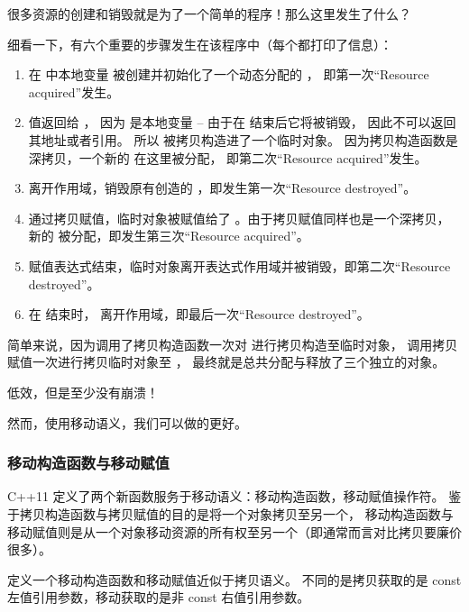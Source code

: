\documentclass[../../LearnCpp.tex]{subfiles}
\begin{document}
很多资源的创建和销毁就是为了一个简单的程序！那么这里发生了什么？

细看一下，有六个重要的步骤发生在该程序中（每个都打印了信息）：

\begin{enumerate}
  \item 在  中本地变量  被创建并初始化了一个动态分配的 ，
        即第一次“Resource acquired”发生。
  \item {} 值返回给 ，
        因为  是本地变量 -- 由于在  结束后它将被销毁，
        因此不可以返回其地址或者引用。
        所以  被拷贝构造进了一个临时对象。
        因为拷贝构造函数是深拷贝，一个新的  在这里被分配，
        即第二次“Resource acquired”发生。
  \item {} 离开作用域，销毁原有创造的 ，即发生第一次“Resource destroyed”。
  \item 通过拷贝赋值，临时对象被赋值给了 。由于拷贝赋值同样也是一个深拷贝，
        新的  被分配，即发生第三次“Resource acquired”。
  \item 赋值表达式结束，临时对象离开表达式作用域并被销毁，即第二次“Resource destroyed”。
  \item 在  结束时， 离开作用域，即最后一次“Resource destroyed”。
\end{enumerate}

简单来说，因为调用了拷贝构造函数一次对  进行拷贝构造至临时对象，
调用拷贝赋值一次进行拷贝临时对象至 ，
最终就是总共分配与释放了三个独立的对象。

低效，但是至少没有崩溃！

然而，使用移动语义，我们可以做的更好。

\subsubsection*{移动构造函数与移动赋值}

C++11 定义了两个新函数服务于移动语义：移动构造函数，移动赋值操作符。
鉴于拷贝构造函数与拷贝赋值的目的是将一个对象拷贝至另一个，
移动构造函数与移动赋值则是从一个对象移动资源的所有权至另一个（即通常而言对比拷贝要廉价很多）。

定义一个移动构造函数和移动赋值近似于拷贝语义。
不同的是拷贝获取的是 const 左值引用参数，移动获取的是非 const 右值引用参数。
\end{document}
